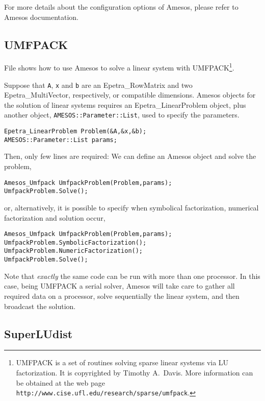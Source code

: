 For more details about the configuration options of Amesos, please refer
to Amesos documentation.


\subsection{UMFPACK}
\label{sec:umfpack}

File  shows how to use Amesos to solve a linear
system with UMFPACK\footnote{UMFPACK is a set of routines solving sparse
  linear systems via LU factorization. It is copyrighted by Timothy
  A.~Davis. More information can be obtained at the web page 
  {\tt http://www.cise.ufl.edu/research/sparse/umfpack}. }.

Suppose that \verb!A!, \verb!x! and \verb!b! are an Epetra\_RowMatrix
and two Epetra\_MultiVector, respectively, or compatible dimensions.
Amesos objects for the solution of linear systems requires an
Epetra\_LinearProblem object, plus another object,
\verb!AMESOS::Parameter::List!, used to specify the parameters.
\begin{verbatim}
Epetra_LinearProblem Problem(&A,&x,&b);
AMESOS::Parameter::List params;
\end{verbatim}
Then, only few lines are required: We can define an Amesos object and
solve the problem,
\begin{verbatim}
Amesos_Umfpack UmfpackProblem(Problem,params);
UmfpackProblem.Solve();
\end{verbatim}
or, alternatively, it is possible to specify when symbolical
factorization, numerical factorization and solution occur,
\begin{verbatim}
Amesos_Umfpack UmfpackProblem(Problem,params); 
UmfpackProblem.SymbolicFactorization();
UmfpackProblem.NumericFactorization();
UmfpackProblem.Solve();
\end{verbatim}
Note that {\sl exactly} the same code can be run with more than one
processor. In this case, being UMFPACK a serial solver, Amesos will take
care to gather all required data on a processor, solve sequentially
the linear system, and then broadcast the solution.


\subsection{SuperLUdist}
\label{sec:superludist}

